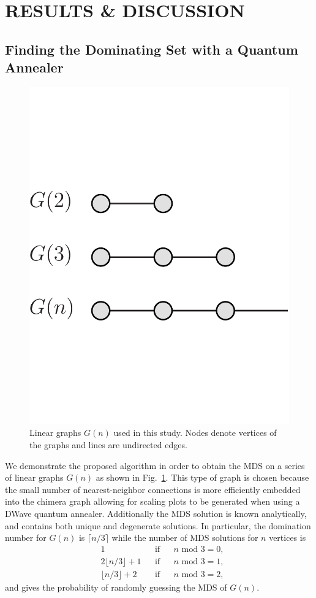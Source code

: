 \documentclass[prd,twocolumn,tightenlines,preprintnumbers,showpacs,superscriptaddress,notitlepage,nofootinbib,eqsecnum,floatfix,longbibliography]{revtex4}
\begin{document}
\section{RESULTS \& DISCUSSION}
\label{sec:results}

\subsection{Finding the Dominating Set with a Quantum Annealer}
\label{sec:discussion:qa}

\begin{figure}[b]
    \centering
        \includegraphics[width=0.5\columnwidth]{./figures/linear_crop.pdf}
    \caption{Linear graphs $G(n)$ used in this study.
Nodes denote vertices of the graphs and lines are undirected edges.}
    \label{fig:linear}
\end{figure}

We demonstrate the proposed algorithm in order to obtain the MDS on a series of linear graphs $G(n)$ as shown in Fig.~\ref{fig:linear}.
This type of graph is chosen because the small number of nearest-neighbor connections is more efficiently embedded into the chimera graph allowing for scaling plots to be generated when using a DWave quantum annealer.
Additionally the MDS solution is known analytically, and contains both unique and degenerate solutions.
In particular, the domination number for $G(n)$ is $\lceil n/3 \rceil$ while the number of MDS solutions for $n$ vertices is
\begin{align}
    &1 &&\textrm{if} && n\textrm{ mod }3=0,\nonumber \\
    &2\lfloor n/3 \rfloor + 1 && \textrm{if}&& n\textrm{ mod }3=1,\nonumber \\
    &\lfloor n/3 \rfloor + 2 && \textrm{if} && n \textrm{ mod }3 = 2,
\end{align}
and gives the probability of randomly guessing the MDS of $G(n)$.
\end{document}
